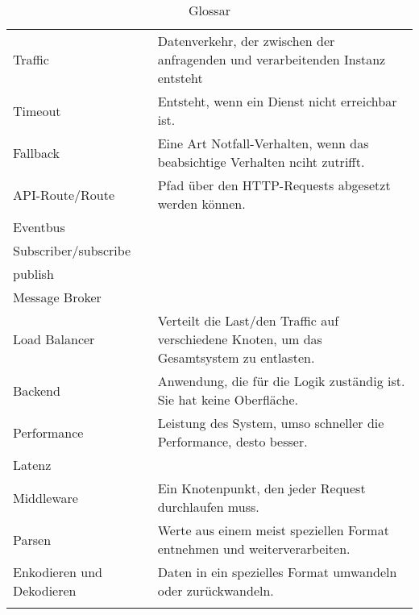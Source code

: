 \begin{longtable}[center]{lp{10cm}}
				Traffic & Datenverkehr, der zwischen der anfragenden und verarbeitenden Instanz entsteht\\
				Timeout & Entsteht, wenn ein Dienst nicht erreichbar ist.\\
				Fallback & Eine Art Notfall-Verhalten, wenn das beabsichtige Verhalten nciht zutrifft.\\
				API-Route/Route & Pfad über den HTTP-Requests abgesetzt werden können.\\
				Eventbus & \\
				Subscriber/subscribe & \\
				publish & \\
				Message Broker & \\
				Load Balancer & Verteilt die Last/den Traffic auf verschiedene Knoten, um das Gesamtsystem zu entlasten.\\
				Backend & Anwendung, die für die Logik zuständig ist. Sie hat keine Oberfläche.\\
				Performance & Leistung des System, umso schneller die Performance, desto besser.\\
				Latenz & \\
				Middleware & Ein Knotenpunkt, den jeder Request durchlaufen muss. \\
				Parsen & Werte aus einem meist speziellen Format entnehmen und weiterverarbeiten. \\ 
				Enkodieren und Dekodieren & Daten in ein spezielles Format umwandeln oder zurückwandeln.\\
		\caption[Glossar]{Glossar}
\end{longtable}